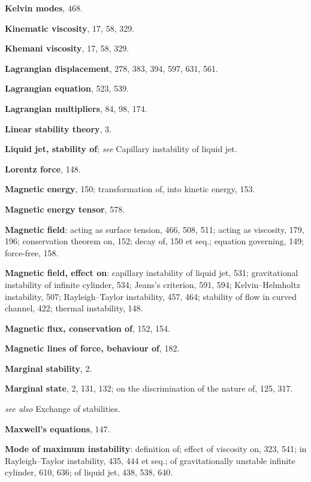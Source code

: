 \begin{small}
\medskip\noindent
\textbf{Kelvin modes}, 468.

\medskip\noindent
\textbf{Kinematic viscosity}, 17, 58, 329.

\medskip\noindent
\textbf{Khemani viscosity}, 17, 58, 329.

\bigskip\noindent
\textbf{Lagrangian displacement}, 278, 383, 394,
  597, 631, 561.

\medskip\noindent
\textbf{Lagrangian equation}, 523, 539.

\medskip\noindent
\textbf{Lagrangian multipliers}, 84, 98, 174.

\medskip\noindent
\textbf{Linear stability theory}, 3.

\medskip\noindent
\textbf{Liquid jet, stability of}; \textit{see} Capillary instability of liquid jet.

\medskip\noindent
\textbf{Lorentz force}, 148.

\bigskip\noindent
\textbf{Magnetic energy}, 150;
  transformation of, into kinetic energy,
    153.

\medskip\noindent
\textbf{Magnetic energy tensor}, 578.

\medskip\noindent
\textbf{Magnetic field}:
  acting as surface tension, 466, 508,
    511;
  acting as viscosity, 179, 196;
  conservation theorem on, 152;
  decay of, 150 et seq.;
  equation governing, 149;
  force-free, 158.

\medskip\noindent
\textbf{Magnetic field, effect on}:
  capillary instability of liquid jet, 531;
  gravitational instability of infinite cylinder, 534;
  Jeans's criterion, 591, 594;
  Kelvin--Helmholtz instability, 507;
  Rayleigh--Taylor instability, 457, 464;
  stability of flow in curved channel, 422;
  thermal instability, 148.

\medskip\noindent
\textbf{Magnetic flux, conservation of}, 152,
  154.

\medskip\noindent
\textbf{Magnetic lines of force, behaviour of}, 182.

\medskip\noindent
\textbf{Marginal stability}, 2.

\medskip\noindent
\textbf{Marginal state}, 2, 131, 132;
  on the discrimination of the nature of,
    125, 317.

\noindent\quad \textit{see also} Exchange of stabilities.

\medskip\noindent
\textbf{Maxwell's equations}, 147.

\medskip\noindent
\textbf{Mode of maximum instability}:
  definition of;
  effect of viscosity on, 323, 541;
  in Rayleigh--Taylor instability, 435, 444
    et seq.;
  of gravitationally unstable infinite cylinder, 610, 636;
  of liquid jet, 438, 538, 640.


\end{small}
